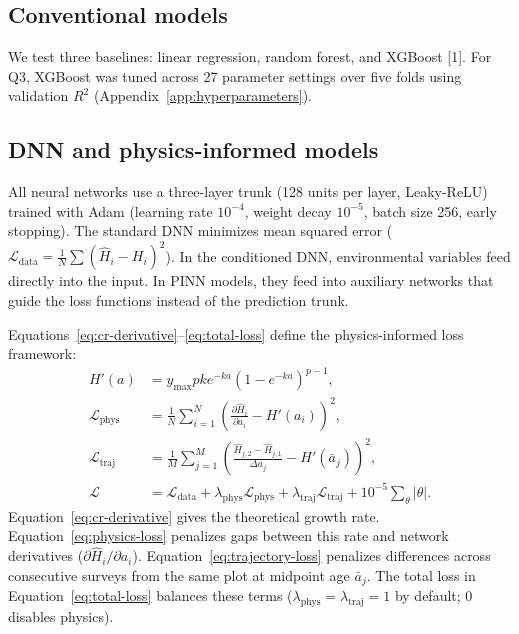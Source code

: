 \subsection*{Conventional models}
We test three baselines: linear regression, random forest, and XGBoost [1]. For Q3, XGBoost was tuned across 27 parameter settings over five folds using validation $R^2$ (Appendix~\ref{app:hyperparameters}).

\subsection{DNN and physics-informed models}
All neural networks use a three-layer trunk (128 units per layer, Leaky-ReLU) trained with Adam (learning rate $10^{-4}$, weight decay $10^{-5}$, batch size 256, early stopping). The standard DNN minimizes mean squared error ($\mathcal{L}_{\mathrm{data}} = \frac{1}{N}\sum (\hat H_i-H_i)^2$). In the conditioned DNN, environmental variables feed directly into the input. In PINN models, they feed into auxiliary networks that guide the loss functions instead of the prediction trunk.

Equations~\eqref{eq:cr-derivative}--\eqref{eq:total-loss} define the physics-informed loss framework:
\begin{align}
H'(a) &= y_{\max}pk e^{-ka}\left(1-e^{-ka}\right)^{p-1}, \label{eq:cr-derivative} \\
\mathcal{L}_{\mathrm{phys}} &= \frac{1}{N}\sum_{i=1}^{N}\left(\frac{\partial\hat H_i}{\partial a_i}-H'(a_i)\right)^2, \label{eq:physics-loss} \\
\mathcal{L}_{\mathrm{traj}} &= \frac{1}{M}\sum_{j=1}^{M}\left(\frac{\hat H_{j,2}-\hat H_{j,1}}{\Delta a_j}-H'(\bar a_j)\right)^2, \label{eq:trajectory-loss} \\
\mathcal{L} &= \mathcal{L}_{\mathrm{data}} + \lambda_{\mathrm{phys}}\mathcal{L}_{\mathrm{phys}} + \lambda_{\mathrm{traj}}\mathcal{L}_{\mathrm{traj}} + 10^{-5}\sum_{\theta}|\theta|. \label{eq:total-loss}
\end{align}
Equation~\eqref{eq:cr-derivative} gives the theoretical growth rate. Equation~\eqref{eq:physics-loss} penalizes gaps between this rate and network derivatives ($\partial\hat H_i/\partial a_i$). Equation~\eqref{eq:trajectory-loss} penalizes differences across consecutive surveys from the same plot at midpoint age $\bar a_j$. The total loss in Equation~\eqref{eq:total-loss} balances these terms ($\lambda_{\mathrm{phys}}=\lambda_{\mathrm{traj}}=1$ by default; 0 disables physics). 

